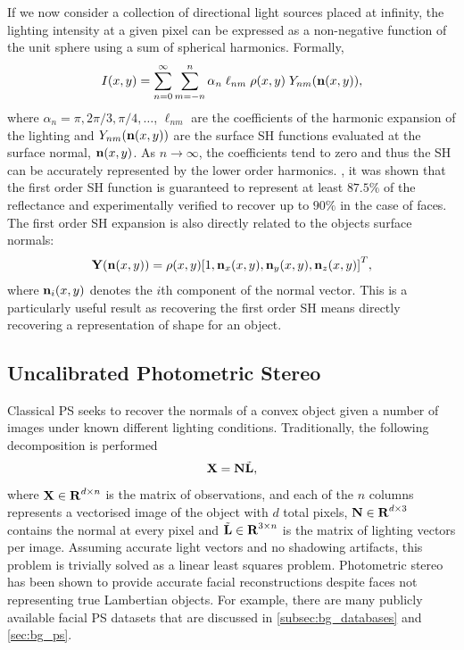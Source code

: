 If we now consider a collection of directional light sources placed at infinity,
the lighting intensity at a given pixel can be expressed as a non-negative
function of the unit sphere using a sum of spherical harmonics. Formally,
\begin{equation}\label{eq:spherical_harmonics}
    I(x, y) = \sum^{\infty}_{n=0} \sum^{n}_{m=-n} \alpha_n \; \ell_{nm} \; \rho(x,y) \; Y_{nm}(\boldsymbol{\mathbf{n}}(x,y)),
\end{equation}
where $\alpha_n = \pi, 2\pi/3, \pi/4, \ldots$, $\ell_{nm}$ are the coefficients
of the harmonic expansion of the lighting and $Y_{nm}(\boldsymbol{\mathbf{n}}(x,y))$ are the
surface SH functions evaluated at the surface normal, $\boldsymbol{\mathbf{n}}(x,y)$. As
$n \rightarrow \infty$, the coefficients tend to zero and thus the SH can be
accurately represented by the lower order harmonics. \citet{frolova2004accuracy}, it
was shown that the first order SH function is guaranteed to represent at least
$87.5\%$ of the reflectance and experimentally verified to recover up to $90\%$
in the case of faces. The first order SH expansion is also directly related to
the objects surface normals:
\begin{equation}\label{eq:first_order_spherical_harmonics}
    \begin{aligned}
        \boldsymbol{\mathbf{Y}}(\boldsymbol{\mathbf{n}}(x, y))  = \rho(x, y) {[ 1, \boldsymbol{\mathbf{n}}_{x}(x, y), \boldsymbol{\mathbf{n}}_{y}(x, y), \boldsymbol{\mathbf{n}}_{z}(x, y) ]}^T,
   \end{aligned}
\end{equation}
where $\boldsymbol{\mathbf{n}}_{i}(x, y)$ denotes the $i$th component of the normal vector. 
This is a particularly useful result as recovering the first order SH means 
directly recovering a representation of shape for an object.
\subsection{Uncalibrated Photometric Stereo}\label{subsec:imag_coll_uncalibrated_ps}
Classical PS seeks to recover the normals of a convex
object given a number of images under known different lighting conditions. 
Traditionally, the following decomposition is performed
\begin{equation}\label{eq:general_ps}
    \boldsymbol{\mathbf{X}} = \boldsymbol{\mathbf{N}} \tilde{\boldsymbol{\mathbf{L}}},
\end{equation}
where $\boldsymbol{\mathbf{X}} \in \boldsymbol{\mathbf{R}}^{d \times n}$ is the matrix of observations,
and each of the $n$ columns represents a vectorised image of the object with $d$
total pixels, $\boldsymbol{\mathbf{N}} \in \boldsymbol{\mathbf{R}}^{d \times 3}$ contains the normal at
every pixel and $\tilde{\boldsymbol{\mathbf{L}}} \in \boldsymbol{\mathbf{R}}^{3 \times n}$ is the matrix
of lighting vectors per image. Assuming accurate light vectors and no shadowing
artifacts, this problem is trivially solved as a linear least squares problem.
Photometric stereo has been shown to provide accurate facial reconstructions
despite faces not representing true Lambertian objects. For example, there are
many publicly available facial PS datasets that are discussed in
\cref{subsec:bg_databases} and \cref{sec:bg_ps}.

